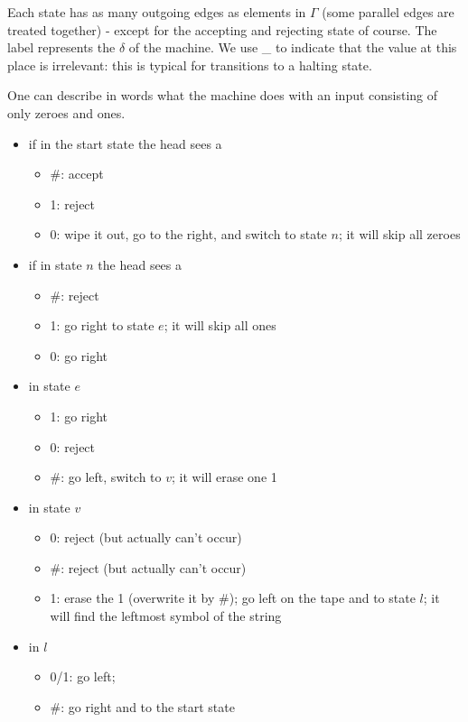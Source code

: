 Each state has as many outgoing edges as elements in $\Gamma$ (some
parallel edges are treated together) - except for the accepting and rejecting
state of course. The label represents the $\delta$ of the machine. We
use \_ to indicate that the value at this place is irrelevant: this is
typical for transitions to a halting state.


One can describe in words what the machine does with an input
consisting of only zeroes and ones.

\begin{itemize}
\item if in the start state the head sees a
\begin{itemize}
\item \#: accept
\item 1: reject
\item 0: wipe it out, go to the right, and switch to state $n$; it
  will skip all zeroes
\end{itemize}

\item if in state $n$ the head sees a
\begin{itemize}
\item \#: reject
\item 1: go right to state $e$; it will skip all ones
\item 0: go right
\end{itemize}


\item in state $e$
\begin{itemize}
\item 1: go right
\item 0: reject
\item \#: go left, switch to $v$; it will erase one 1
\end{itemize}

\item in state $v$
\begin{itemize}
\item 0: reject (but actually can't occur)
\item \#: reject (but actually can't occur)
\item 1: erase the 1 (overwrite it by \#); go left on the tape and to
  state $l$; it will find the leftmost symbol of the string
\end{itemize}

\item in $l$
\begin{itemize}
\item 0/1: go left;
\item \#: go right and to the start state
\end{itemize}

\end{itemize}

